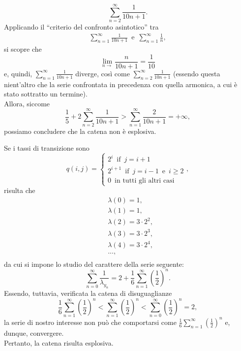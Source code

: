 \documentclass[11pt,largemargins]{homework}
\begin{document}
\begin{alphaparts}
\begin{equation*}
\sum_{n=2}^{\infty}\frac{1}{10n+1}.
\end{equation*}
Applicando il ``criterio del confronto asintotico'' tra
\begin{align*}
\sum_{n=1}^{\infty}\frac{1}{10n+1}\,\,\, \text{e} \,\,\, \sum_{n=1}^{\infty}\frac{1}{n},
\end{align*}
si scopre che
\begin{equation*}
\lim\limits_{n\rightarrow}\frac{n}{10n+1}=\frac{1}{10}
\end{equation*}
  e, quindi, $\sum_{n=1}^{\infty}\frac{1}{10n+1}$ diverge, così come $\sum_{n=2}^{\infty}\frac{1}{10n+1}$ (essendo questa nient'altro che la serie confrontata in precedenza con quella armonica, a cui è stato sottratto un termine).\\
  Allora, siccome
  \begin{equation*}
  \frac{1}{5}+2
\sum_{n=2}^{\infty}\frac{1}{10n+1}>\sum_{n=1}^{\infty}\frac{2}{10n+1}=+\infty,
\end{equation*} 
  possiamo concludere che la catena non è esplosiva.
  
  \questionpart
  Se i tassi di transizione sono
  \begin{equation*}
  q\left(i,j\right)=\begin{cases}2^{i} \,\,\,\text{if}\,\,\,j=i+1\\2^{i+1} \,\,\,\text{if}\,\,\,j=i-1\,\,\,\text{e}\,\,\,i\geq 2\\0 \,\,\, \text{in tutti gli altri casi}\end{cases},
  \end{equation*}
  risulta che
  \begin{align*}
&\lambda\left(0\right)= 1,\\
&\lambda\left(1\right)= 1,\\
&\lambda\left(2\right)= 3\cdot 2^{2},\\
&\lambda\left(3\right)=3\cdot 2^{3},\\
&\lambda\left(4\right)=3\cdot 2^{4},\\
&...,\\
\end{align*}
da cui si impone lo studio del carattere della serie seguente:
\begin{equation*}
\sum_{n=0}^{\infty}\frac{1}{\lambda_{y_{n}}}=2+\frac{1}{6}\sum_{n=1}^{\infty}\left(\frac{1}{2}\right)^{n}.
\end{equation*}
Essendo, tuttavia, verificata la catena di disuguaglianze
\begin{equation*}
\frac{1}{6}\sum_{n=1}^{\infty}\left(\frac{1}{2}\right)^{n}<\sum_{n=1}^{\infty}\left(\frac{1}{2}\right)^{n}<\sum_{n=0}^{\infty}\left(\frac{1}{2}\right)^{n}=2,
\end{equation*}
la serie di nostro interesse non può che comportarsi come $\frac{1}{6}\sum_{n=1}^{\infty}\left(\frac{1}{2}\right)^{n}$  e, dunque, convergere. \\
Pertanto, la catena risulta esplosiva.
  \end{alphaparts}
  
\end{document}

